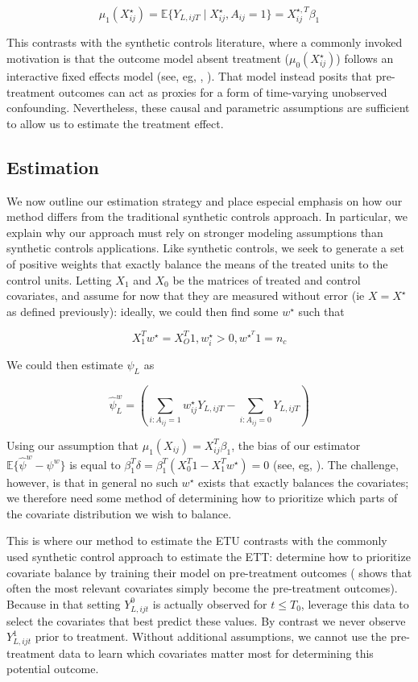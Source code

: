\documentclass[12pt]{article}
\begin{document}
$$
\mu_1(X^\star_{ij}) = \mathbb{E}\{Y_{L, ijT} \mid X^\star_{ij}, A_{ij} = 1\} = X_{ij}^{\star, T}\beta_1 
$$

This contrasts with the synthetic controls literature, where a commonly invoked motivation is that the outcome model absent treatment ($\mu_0(X^\star_{ij})$) follows an interactive fixed effects model (see, eg, \cite{abadie2010synthetic}, \cite{ben2018augmented}). That model instead posits that pre-treatment outcomes can act as proxies for a form of time-varying unobserved confounding. Nevertheless, these causal and parametric assumptions are sufficient to allow us to estimate the treatment effect. 

\subsection{Estimation}

We now outline our estimation strategy and place especial emphasis on how our method differs from the traditional synthetic controls approach. In particular, we explain why our approach must rely on stronger modeling assumptions than synthetic controls applications. Like synthetic controls, we seek to generate a set of positive weights that exactly balance the means of the treated units to the control units. Letting $X_1$ and $X_0$ be the matrices of treated and control covariates, and assume for now that they are measured without error (ie $X = X^\star$ as defined previously): ideally, we could then find some $w^\star$ such that 

$$
X_1^Tw^\star = X_O^T1, w_i^\star > 0, w^\star^T1 = n_c
$$

We could then estimate $\psi_L$ as

$$
\hat{\psi}_L^w = (\sum_{i: A_{ij} = 1}w_{ij}^\star Y_{L, ijT} - \sum_{i: A_{ij} = 0}Y_{L, ijT})
$$

Using our assumption that $\mu_1(X_{ij}) = X_{ij}^T\beta_1$, the bias of our estimator $\mathbb{E}\{\hat{\psi}^w - \psi^w\}$ is equal to $\beta_1^T \delta = \beta_1^T(X_0^T1 - X_1^Tw^\star) = 0$ (see, eg, \cite{zubizarreta2015stable}). The challenge, however, is that in general no such $w^\star$ exists that exactly balances the covariates; we therefore need some method of determining how to prioritize which parts of the covariate distribution we wish to balance.

This is where our method to estimate the ETU contrasts with the commonly used synthetic control approach to estimate the ETT: \cite{abadie2010synthetic} determine how to prioritize covariate balance by training their model on pre-treatment outcomes (\cite{kaul2015synthetic} shows that often the most relevant covariates simply become the pre-treatment outcomes). Because in that setting $Y^0_{L, ijt}$ is actually observed for $t \le T_0$, \cite{abadie2010synthetic} leverage this data to select the covariates that best predict these values. By contrast we never observe $Y^1_{L, ijt}$ prior to treatment. Without additional assumptions, we cannot use the pre-treatment data to learn which covariates matter most for determining this potential outcome.
\end{document}
